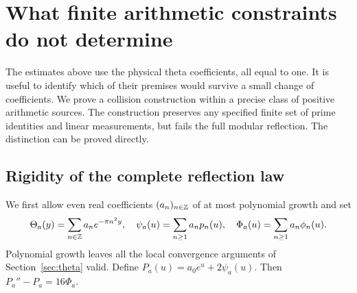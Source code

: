\section{What finite arithmetic constraints do not determine}\label{sec:controls}

The estimates above use the physical theta coefficients, all equal to one.
It is useful to identify which of their premises would survive a small
change of coefficients. We prove a collision construction within a precise
class of positive arithmetic sources. The construction preserves any
specified finite set of prime identities and linear measurements, but
fails the full modular reflection. The distinction can be proved directly.

\subsection{Rigidity of the complete reflection law}

We first allow even real coefficients $(a_n)_{n\in\mathbb Z}$ of at most polynomial
growth and set
\[
 \Theta_a(y)=\sum_{n\in\mathbb Z}a_ne^{-\pi n^2y},\quad
 \psi_a(u)=\sum_{n\ge1}a_np_n(u),\quad
 \Phi_a(u)=\sum_{n\ge1}a_n\phi_n(u).
\]
Polynomial growth leaves all the local convergence arguments of
Section~\ref{sec:theta} valid. Define
$P_a(u)=a_0e^u+2\psi_a(u)$. Then $P_a''-P_a=16\Phi_a$.

